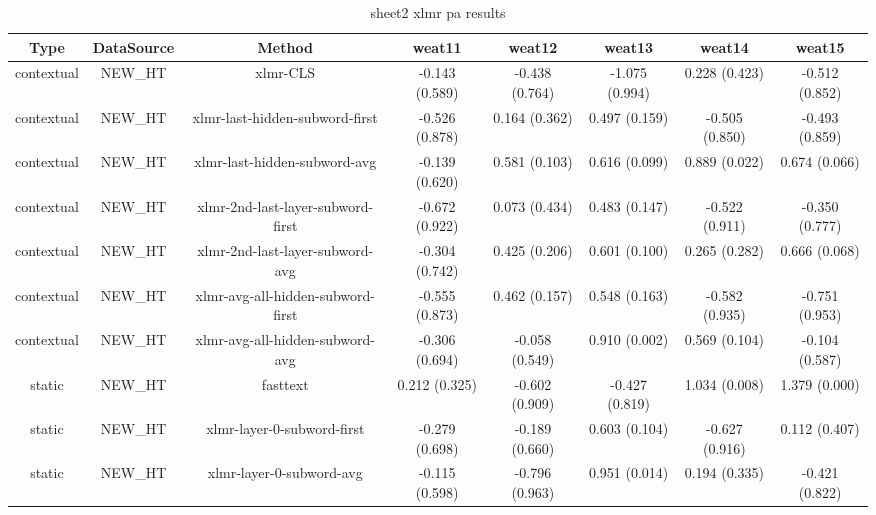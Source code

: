 \begin{sidewaystable}[htb]
    \centering
    \caption{sheet2 xlmr pa results}
    \label{appendix_tab:sheet2_xlmr_pa_results}
    \small
    \begin{tabular}{@{}cccccccc@{}}
        \toprule
        Type & DataSource & Method & weat11 & weat12 & weat13 & weat14 & weat15 \\
        \midrule
        contextual & NEW\_HT & xlmr-CLS & -0.143 (0.589) & -0.438 (0.764) & -1.075 (0.994) & 0.228 (0.423) & -0.512 (0.852) \\
        contextual & NEW\_HT & xlmr-last-hidden-subword-first & -0.526 (0.878) & 0.164 (0.362) & 0.497 (0.159) & -0.505 (0.850) & -0.493 (0.859) \\
        contextual & NEW\_HT & xlmr-last-hidden-subword-avg & -0.139 (0.620) & 0.581 (0.103) & 0.616 (0.099) & 0.889 (0.022) & 0.674 (0.066) \\
        contextual & NEW\_HT & xlmr-2nd-last-layer-subword-first & -0.672 (0.922) & 0.073 (0.434) & 0.483 (0.147) & -0.522 (0.911) & -0.350 (0.777) \\
        contextual & NEW\_HT & xlmr-2nd-last-layer-subword-avg & -0.304 (0.742) & 0.425 (0.206) & 0.601 (0.100) & 0.265 (0.282) & 0.666 (0.068) \\
        contextual & NEW\_HT & xlmr-avg-all-hidden-subword-first & -0.555 (0.873) & 0.462 (0.157) & 0.548 (0.163) & -0.582 (0.935) & -0.751 (0.953) \\
        contextual & NEW\_HT & xlmr-avg-all-hidden-subword-avg & -0.306 (0.694) & -0.058 (0.549) & 0.910 (0.002) & 0.569 (0.104) & -0.104 (0.587) \\
        static & NEW\_HT & fasttext & 0.212 (0.325) & -0.602 (0.909) & -0.427 (0.819) & 1.034 (0.008) & 1.379 (0.000) \\
        static & NEW\_HT & xlmr-layer-0-subword-first & -0.279 (0.698) & -0.189 (0.660) & 0.603 (0.104) & -0.627 (0.916) & 0.112 (0.407) \\
        static & NEW\_HT & xlmr-layer-0-subword-avg & -0.115 (0.598) & -0.796 (0.963) & 0.951 (0.014) & 0.194 (0.335) & -0.421 (0.822) \\
        \bottomrule
    \end{tabular}
\end{sidewaystable}
